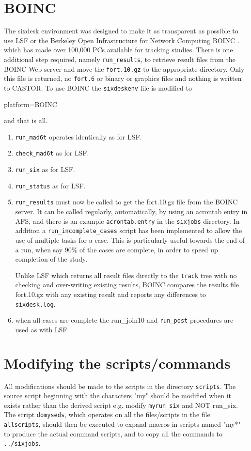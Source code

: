 \documentclass{article}    %
\begin{document}
\section{BOINC}
The sixdesk environment was designed to make it as transparent as possible
to use LSF or the 
Berkeley Open Infrastructure for Network Computing BOINC \cite{Boinc}.
which has made over 100,000 PCs available for tracking studies.
There is one additional step required, namely {\tt run\_results}, to
retrieve result files from the BOINC Web server 
and move the {\tt fort.10.gz} to the appropriate directory.
Only this file is returned, no {\tt fort.6} or binary
or graphics files and nothing is written to CASTOR.
To use BOINC the {\tt sixdeskenv} file is modified to
\begin{description}
\item[platform=BOINC]
\end{description}
and that is all.
\begin{enumerate}
\item {\tt run\_mad6t} operates identically as for LSF.
\item {\tt check\_mad6t} as for LSF.
\item {\tt run\_six} as for LSF. 
\item {\tt run\_status} as for LSF. 
\item {\tt run\_results} must now be called to get the fort.10.gz file from the
BOINC server. It can be called regularly, automatically, by using an acrontab
entry in AFS, and there is an example {\tt acrontab.entry} in the {\tt sixjobs}
directory. In addition a {\tt run\_incomplete\_cases} script has been implemented to
allow the use of multiple tasks for a case. This is particularly useful  
towards the end of a run,
when say 90\% of the cases are complete, in order 
to speed up completion of the study.

Unlike LSF which returns all result files directly to the {\tt track} tree
with no checking and over-writing existing results, BOINC 
compares the results file fort.10.gz with any existing result
and reports any differences to {\tt sixdesk.log}.
\item when all cases are complete the {run\_join10} and {\tt run\_post}
procedures are used as with LSF.
\end{enumerate}

\section{Modifying the scripts/commands}
All modifications should be made to the scripts in the directory
{\tt scripts}. The source script beginning with the characters
"my" should be modified when it exists rather than the derived script
e.g. modify {\tt myrun\_six} and NOT {run\_six}. The script {\tt domyseds},
which operates on all the files/scripts in the file {\tt allscripts},
should then be executed to expand macros in scripts named "my*" to
produce the actual command scripts, and to copy  all the commands
to {\tt ../sixjobs}.
\end{document}
